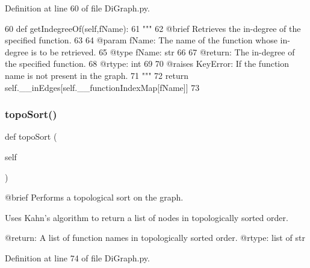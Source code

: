 Definition at line 60 of file Di\+Graph.\+py.


\begin{DoxyCode}
60     \textcolor{keyword}{def }getIndegreeOf(self,fName):
61         \textcolor{stringliteral}{"""
}
62 \textcolor{stringliteral}{        @brief Retrieves the in-degree of the specified function.
}
63 \textcolor{stringliteral}{
}
64 \textcolor{stringliteral}{        @param fName: The name of the function whose in-degree is to be retrieved.
}
65 \textcolor{stringliteral}{        @type fName: str
}
66 \textcolor{stringliteral}{
}
67 \textcolor{stringliteral}{        @return: The in-degree of the specified function.
}
68 \textcolor{stringliteral}{        @rtype: int
}
69 \textcolor{stringliteral}{
}
70 \textcolor{stringliteral}{        @raises KeyError: If the function name is not present in the graph.
}
71 \textcolor{stringliteral}{        """}
72         \textcolor{keywordflow}{return} self.\_\_inEdges[self.\_\_functionIndexMap[fName]]
73     
\end{DoxyCode}
\mbox{\label{classDiGraph_1_1DiGraph_ab37be01195a3d4a4cb7c992114e93219}} 
\subsubsection{\texorpdfstring{topo\+Sort()}{topoSort()}}
{\footnotesize\ttfamily def topo\+Sort (\begin{DoxyParamCaption}\item[{}]{self }\end{DoxyParamCaption})}

\begin{DoxyVerb}@brief Performs a topological sort on the graph.

Uses Kahn's algorithm to return a list of nodes in topologically sorted order.

@return: A list of function names in topologically sorted order.
@rtype: list of str
\end{DoxyVerb}
 

Definition at line 74 of file Di\+Graph.\+py.


